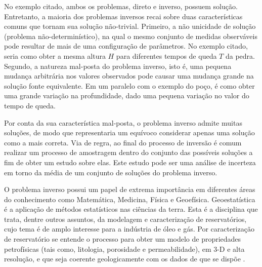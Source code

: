 No exemplo citado, ambos os problemas, direto e inverso, possuem solução. Entretanto,
a maioria dos problemas inversos recai sobre duas características
comuns que tornam sua solução não-trivial. Primeiro, a não unicidade de solução
(problema não-determinístico), na qual o mesmo conjunto de medidas
observáveis pode resultar de mais de uma configuração de parâmetros. No exemplo
citado, seria como obter a mesma altura $H$ para diferentes tempos
de queda $T$ da pedra. Segundo, a natureza mal-posta do problema inverso, isto é,
uma pequena mudança arbitrária nos valores observados pode causar uma mudança grande
na solução fonte equivalente. Em um paralelo com o exemplo do poço, é como
obter uma grande variação na profundidade, dado uma pequena variação no valor do tempo de queda.

Por conta da sua característica mal-posta, o problema inverso
admite muitas soluções, de modo que representaria um equívoco considerar apenas
uma solução como a mais correta. Via de regra, ao final do processo de inversão é comum
realizar um processo de amostragem dentro do conjunto das possíveis soluções a fim
de obter um estudo sobre elas. Este estudo pode ser uma análise de 
incerteza em torno da média de um conjunto de soluções do problema inverso.

O problema inverso possui um papel de extrema importância em diferentes áreas do conhecimento
como Matemática, Medicina, Física e Geoefísica. Geoestatística é a aplicação de métodos
estatísticos nas ciências da terra. Esta é a disciplina que trata, dentre outros assuntos, da modelagem
e caracterização de reservatórios, cujo tema é de amplo interesse para a indústria de óleo
e gás. Por caracterização de reservatório se entende o processo para obter um modelo de propriedades
petrofísicas (tais como, litologia, porosidade e permeabilidade),
em 3-D e alta resolução, e que seja coerente geologicamente com os dados de que se dispõe \citep{deutsch2002}.

